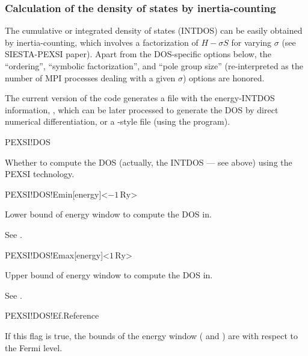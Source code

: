 \subsubsection{Calculation of the density of states by
  inertia-counting}
\label{pexsi-dos}

The cumulative or integrated density of states (INTDOS) can be easily
obtained by inertia-counting, which involves a factorization of
$H-\sigma S$ for varying $\sigma$ (see SIESTA-PEXSI paper).  Apart
from the DOS-specific options below, the ``ordering'', ``symbolic
factorization'', and ``pole group size'' (re-interpreted as the number
of MPI processes dealing with a given $\sigma$) options are honored.

The current version of the code generates a file with the
energy-INTDOS information, , which can be later
processed to generate the DOS by direct numerical differentiation, or
a \siesta-style  file (using the 
program).

\begin{fdflogicalF}{PEXSI!DOS}

  Whether to compute the DOS (actually, the INTDOS --- see above)
  using the PEXSI technology.
  
\end{fdflogicalF}

\begin{fdfentry}{PEXSI!DOS!Emin}[energy]<$-1\,\mathrm{Ry}$>

  Lower bound of energy window to compute the DOS in.

  See .

\end{fdfentry}

\begin{fdfentry}{PEXSI!DOS!Emax}[energy]<$1\,\mathrm{Ry}$>

  Upper bound of energy window to compute the DOS in.

  See .

\end{fdfentry}

\begin{fdflogicalT}{PEXSI!DOS!Ef.Reference}

  If this flag is true, the bounds of the energy window
  ( and ) are with respect to
  the Fermi level.

\end{fdflogicalT}

